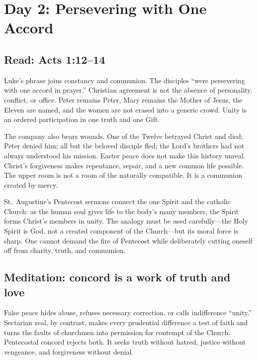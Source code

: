 \section{Day 2: Persevering with One Accord}


\subsection{Read: Acts 1:12--14}

Luke's phrase joins constancy and communion. The disciples “were persevering with one accord in prayer.” Christian agreement is not the absence of personality, conflict, or office. Peter remains Peter, Mary remains the Mother of Jesus, the Eleven are named, and the women are not erased into a generic crowd. Unity is an ordered participation in one truth and one Gift.

The company also bears wounds. One of the Twelve betrayed Christ and died; Peter denied him; all but the beloved disciple fled; the Lord's brothers had not always understood his mission. Easter peace does not make this history unreal. Christ's forgiveness makes repentance, repair, and a new common life possible. The upper room is not a room of the naturally compatible. It is a communion created by mercy.

St.~Augustine's Pentecost sermons connect the one Spirit and the catholic Church: as the human soul gives life to the body's many members, the Spirit forms Christ's members in unity. The analogy must be used carefully---the Holy Spirit is God, not a created component of the Church---but its moral force is sharp. One cannot demand the fire of Pentecost while deliberately cutting oneself off from charity, truth, and communion.

\subsection{Meditation: concord is a work of truth and love}

False peace hides abuse, refuses necessary correction, or calls indifference “unity.” Sectarian zeal, by contrast, makes every prudential difference a test of faith and turns the faults of churchmen into permission for contempt of the Church. Pentecostal concord rejects both. It seeks truth without hatred, justice without vengeance, and forgiveness without denial.

